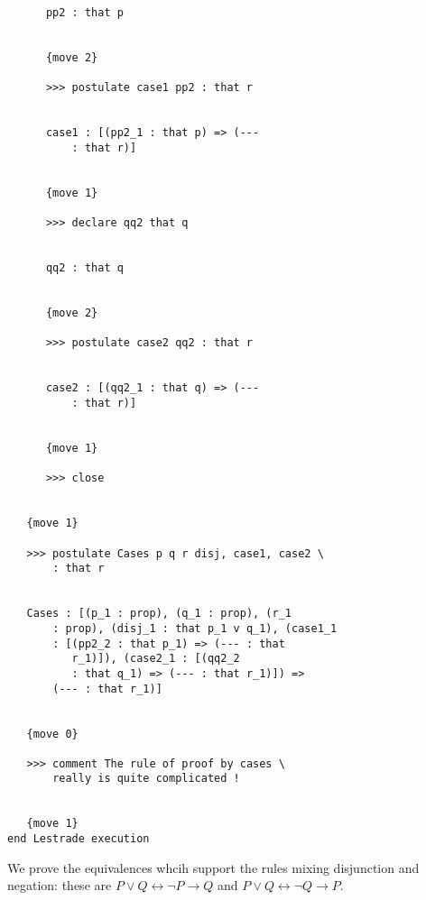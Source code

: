 \documentclass[12pt]{article}
\begin{document}
\begin{verbatim}
      pp2 : that p


      {move 2}

      >>> postulate case1 pp2 : that r


      case1 : [(pp2_1 : that p) => (--- 
          : that r)]


      {move 1}

      >>> declare qq2 that q


      qq2 : that q


      {move 2}

      >>> postulate case2 qq2 : that r


      case2 : [(qq2_1 : that q) => (--- 
          : that r)]


      {move 1}

      >>> close


   {move 1}

   >>> postulate Cases p q r disj, case1, case2 \
       : that r


   Cases : [(p_1 : prop), (q_1 : prop), (r_1 
       : prop), (disj_1 : that p_1 v q_1), (case1_1 
       : [(pp2_2 : that p_1) => (--- : that 
          r_1)]), (case2_1 : [(qq2_2 
          : that q_1) => (--- : that r_1)]) => 
       (--- : that r_1)]


   {move 0}

   >>> comment The rule of proof by cases \
       really is quite complicated !


   {move 1}
end Lestrade execution
\end{verbatim}

We prove the equivalences whcih support the rules mixing disjunction and negation:  these are $P \vee Q \leftrightarrow \neg P \rightarrow Q$ and $P \vee Q \leftrightarrow \neg Q \rightarrow P$.
\end{document}
